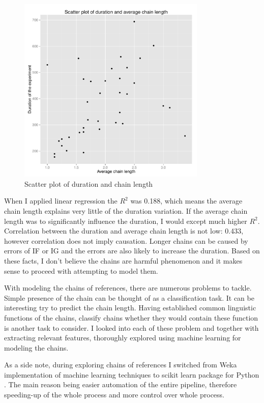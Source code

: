 \begin{figure}[!htbp]
  \centering
	\includegraphics[width=0.8\textwidth]{Images/chains_duration_LR}
	\caption{Scatter plot of duration and chain length}
	\label{fig:chains_dur_scatter}
\end{figure}

When I applied linear regression the $R^2$ was 0.188, which means the average chain length explains very little of the duration variation. If the average chain length was to significantly influence the duration, I would except much higher $R^2$. Correlation between the duration and average chain length is not low: 0.433, however correlation does not imply causation. Longer chains can be caused by errors of IF or IG and the errors are also likely to increase the duration. Based on these facts, I don't believe the chains are harmful phenomenon and it makes sense to proceed with attempting to model them. 

With modeling the chains of references, there are numerous problems to tackle. Simple presence of the chain can be thought of as a classification task. It can be interesting try to predict the chain length. Having established common linguistic functions of the chains, classify chains whether they would contain these function is another task to consider. I looked into each of these problem and together with extracting relevant features, thoroughly explored using machine learning for modeling the chains.

As a side note, during exploring chains of references I switched from Weka implementation of machine learning techniques \citep{hall2009weka} to scikit learn package for Python \citep{scikit-learn}. The main reason being easier automation of the entire pipeline, therefore speeding-up of the whole process and more control over whole process.

